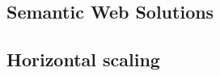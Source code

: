 \subsection{Semantic Web Solutions}
\label{subsec:semweb}


\subsection{Horizontal scaling}
\label{subsec:hscaling}

















